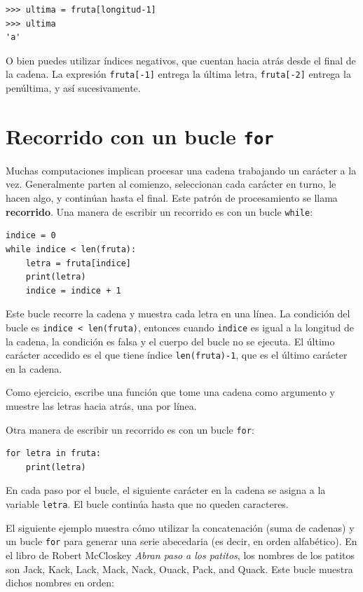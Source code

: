 \documentclass[10pt]{book}
\begin{document}
\begin{verbatim}
>>> ultima = fruta[longitud-1]
>>> ultima
'a'
\end{verbatim}
%
O bien puedes utilizar índices negativos, que cuentan hacia atrás desde
el final de la cadena.  La expresión {\tt fruta[-1]} entrega la última
letra, {\tt fruta[-2]} entrega la penúltima, y así sucesivamente.


\section{Recorrido con un bucle {\tt for}}
\label{for}

Muchas computaciones implican procesar una cadena trabajando un carácter a la
vez.  Generalmente parten al comienzo, seleccionan cada carácter en
turno, le hacen algo, y continúan hasta el final.  Este patrón de
procesamiento se llama {\bf recorrido}.  Una manera de escribir un recorrido
es con un bucle {\tt while}:

\begin{verbatim}
indice = 0
while indice < len(fruta):
    letra = fruta[indice]
    print(letra)
    indice = indice + 1
\end{verbatim}
%
Este bucle recorre la cadena y muestra cada letra en una
línea.  La condición del bucle es {\tt indice < len(fruta)}, entonces
cuando {\tt indice} es igual a la longitud de la cadena, la
condición es falsa y el cuerpo del bucle no se ejecuta.  El
último carácter accedido es el que tiene índice {\tt len(fruta)-1},
que es el último carácter en la cadena.

Como ejercicio, escribe una función que tome una cadena como argumento
y muestre las letras hacia atrás, una por línea.

Otra manera de escribir un recorrido es con un bucle {\tt for}:

\begin{verbatim}
for letra in fruta:
    print(letra)
\end{verbatim}
%
En cada paso por el bucle, el siguiente carácter en la cadena se asigna
a la variable {\tt letra}.  El bucle continúa hasta que no queden
caracteres.

El siguiente ejemplo muestra cómo utilizar la concatenación (suma de cadenas)
y un bucle {\tt for} para generar una serie abecedaria (es decir, en
orden alfabético).  En el libro de Robert McCloskey {\em Abran
paso a los patitos}, los nombres de los patitos son Jack, Kack, Lack,
Mack, Nack, Ouack, Pack, and Quack.  Este bucle muestra dichos nombres en
orden:
\end{document}
